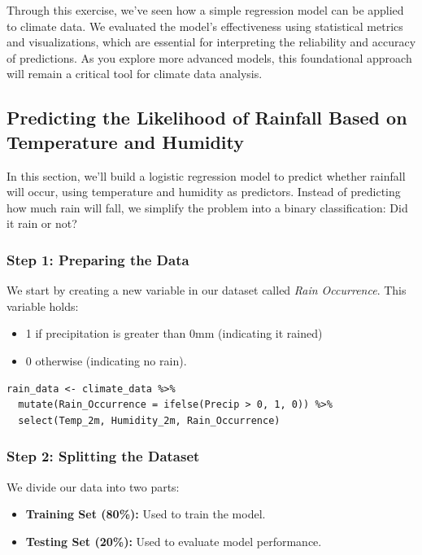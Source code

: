 Through this exercise, we’ve seen how a simple regression model can be applied to climate data. We evaluated the model’s effectiveness using statistical metrics and visualizations, which are essential for interpreting the reliability and accuracy of predictions. As you explore more advanced models, this foundational approach will remain a critical tool for climate data analysis.
\clearpage

\subsection*{Predicting the Likelihood of Rainfall Based on Temperature and Humidity}

In this section, we’ll build a logistic regression model to predict whether rainfall will occur, using temperature and humidity as predictors. Instead of predicting how much rain will fall, we simplify the problem into a binary classification: Did it rain or not?

\subsubsection*{Step 1: Preparing the Data}

We start by creating a new variable in our dataset called \textit{Rain Occurrence}. This variable holds:

\begin{itemize}
  \item 1 if precipitation is greater than 0mm (indicating it rained)
  \item 0 otherwise (indicating no rain).
\end{itemize}

\begin{verbatim}
rain_data <- climate_data %>%
  mutate(Rain_Occurrence = ifelse(Precip > 0, 1, 0)) %>%
  select(Temp_2m, Humidity_2m, Rain_Occurrence)
\end{verbatim}

\subsubsection*{Step 2: Splitting the Dataset}

We divide our data into two parts:

\begin{itemize}
  \item \textbf{Training Set (80\%):} Used to train the model.
  \item \textbf{Testing Set (20\%):} Used to evaluate model performance.
\end{itemize}

